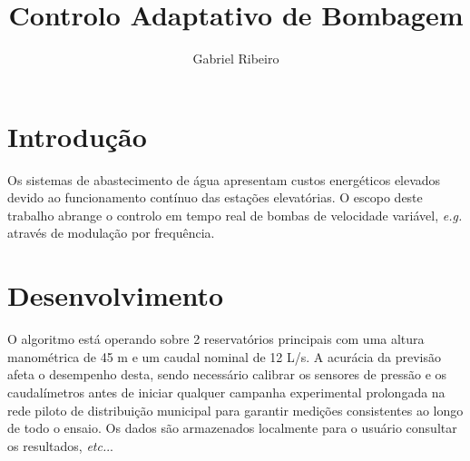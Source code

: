 \documentclass[11pt]{article}
\title{Controlo Adaptativo de Bombagem}
\author{Gabriel Ribeiro}
\begin{document}
\maketitle

\section{Introdução}
Os sistemas de abastecimento de água apresentam custos energéticos elevados devido ao funcionamento contínuo das estações elevatórias.
O escopo deste trabalho abrange o controlo em tempo real de bombas de velocidade variável, \textit{e.g.} através de modulação por frequência.

\section{Desenvolvimento}
O algoritmo está operando sobre 2 reservatórios principais com uma altura manométrica de 45 m e um caudal nominal de 12 L/s.
A acurácia da previsão afeta o desempenho desta, sendo necessário calibrar os sensores de pressão e os caudalímetros antes de iniciar qualquer campanha experimental prolongada na rede piloto de distribuição municipal para garantir medições consistentes ao longo de todo o ensaio.
Os dados são armazenados localmente para o usuário consultar os resultados, \textit{etc.}..
\end{document}
